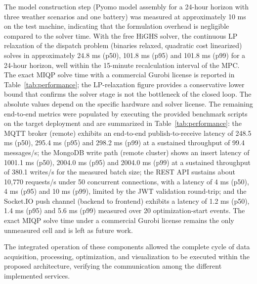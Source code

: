 \documentclass[journal,article,submit,pdftex,moreauthors]{Definitions/mdpi}
\begin{document}
The model construction step (Pyomo model assembly for a 24-hour horizon with three weather scenarios and one battery) was measured at approximately 10 ms on the test machine, indicating that the formulation overhead is negligible compared to the solver time. With the free HiGHS solver, the continuous LP relaxation of the dispatch problem (binaries relaxed, quadratic cost linearized) solves in approximately 24.8 ms (p50), 101.8 ms (p95) and 101.8 ms (p99) for a 24-hour horizon, well within the 15-minute recalculation interval of the MPC. The exact MIQP solve time with a commercial Gurobi license is reported in Table~\ref{tab:performance}; the LP-relaxation figure provides a conservative lower bound that confirms the solver stage is not the bottleneck of the closed loop. The absolute values depend on the specific hardware and solver license. The remaining end-to-end metrics were populated by executing the provided benchmark scripts on the target deployment and are summarized in Table~\ref{tab:performance}: the MQTT broker (remote) exhibits an end-to-end publish-to-receive latency of 248.5 ms (p50), 295.4 ms (p95) and 298.2 ms (p99) at a sustained throughput of 99.4 messages/s; the MongoDB write path (remote cluster) shows an insert latency of 1001.1 ms (p50), 2004.0 ms (p95) and 2004.0 ms (p99) at a sustained throughput of 380.1 writes/s for the measured batch size; the REST API sustains about 10,770 requests/s under 50 concurrent connections, with a latency of 4 ms (p50), 4 ms (p95) and 10 ms (p99), limited by the JWT validation round-trip; and the Socket.IO push channel (backend to frontend) exhibits a latency of 1.2 ms (p50), 1.4 ms (p95) and 5.6 ms (p99) measured over 20 optimization-start events. The exact MIQP solve time under a commercial Gurobi license remains the only unmeasured cell and is left as future work.

The integrated operation of these components allowed the complete cycle of data acquisition, processing, optimization, and visualization to be executed within the proposed architecture, verifying the communication among the different implemented services.
\end{document}
